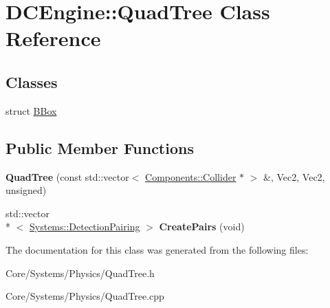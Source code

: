 \hypertarget{classDCEngine_1_1QuadTree}{\section{D\-C\-Engine\-:\-:Quad\-Tree Class Reference}
\label{classDCEngine_1_1QuadTree}
}
\subsection*{Classes}
\begin{DoxyCompactItemize}
\item 
struct \hyperlink{structDCEngine_1_1QuadTree_1_1BBox}{B\-Box}
\end{DoxyCompactItemize}
\subsection*{Public Member Functions}
\begin{DoxyCompactItemize}
\item 
\hypertarget{classDCEngine_1_1QuadTree_afe3b18024c0edd82076f363d1e3f80d5}{{\bfseries Quad\-Tree} (const std\-::vector$<$ \hyperlink{classDCEngine_1_1Components_1_1Collider}{Components\-::\-Collider} $\ast$ $>$ \&, Vec2, Vec2, unsigned)}\label{classDCEngine_1_1QuadTree_afe3b18024c0edd82076f363d1e3f80d5}

\item 
\hypertarget{classDCEngine_1_1QuadTree_acead7a53e2d3c951017638d67bffdab3}{std\-::vector\\*
$<$ \hyperlink{structDCEngine_1_1Systems_1_1DetectionPairing}{Systems\-::\-Detection\-Pairing} $>$ {\bfseries Create\-Pairs} (void)}\label{classDCEngine_1_1QuadTree_acead7a53e2d3c951017638d67bffdab3}

\end{DoxyCompactItemize}


The documentation for this class was generated from the following files\-:\begin{DoxyCompactItemize}
\item 
Core/\-Systems/\-Physics/Quad\-Tree.\-h\item 
Core/\-Systems/\-Physics/Quad\-Tree.\-cpp\end{DoxyCompactItemize}

